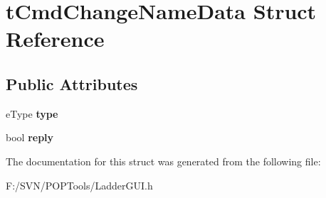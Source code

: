 \hypertarget{structt_cmd_change_name_data}{\section{t\-Cmd\-Change\-Name\-Data Struct Reference}
\label{structt_cmd_change_name_data}
}
\subsection*{Public Attributes}
\begin{DoxyCompactItemize}
\item 
\hypertarget{structt_cmd_change_name_data_a5c82b2a5f4834abb9b1be12c1f403e8c}{e\-Type {\bfseries type}}\label{structt_cmd_change_name_data_a5c82b2a5f4834abb9b1be12c1f403e8c}

\item 
\hypertarget{structt_cmd_change_name_data_a40d2aedb764d8faee953044e53114e06}{bool {\bfseries reply}}\label{structt_cmd_change_name_data_a40d2aedb764d8faee953044e53114e06}

\end{DoxyCompactItemize}


The documentation for this struct was generated from the following file\-:\begin{DoxyCompactItemize}
\item 
F\-:/\-S\-V\-N/\-P\-O\-P\-Tools/Ladder\-G\-U\-I.\-h\end{DoxyCompactItemize}
